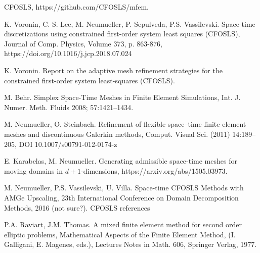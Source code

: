 \documentclass[12pt]{article}
\begin{document}

%


\begin{thebibliography}{100}

CFOSLS, https://github.com/CFOSLS/mfem.

K. Voronin, C.-S. Lee, M. Neumueller, P. Sepulveda, P.S. Vassilevski. Space-time discretizations using constrained first-order system least squares (CFOSLS), Journal of Comp. Physics, Volume 373, p. 863-876, https://doi.org/10.1016/j.jcp.2018.07.024

K. Voronin. Report on the adaptive mesh refinement strategies for the constrained first-order system least-squares (CFOSLS).

M. Behr. Simplex Space-Time Meshes in Finite Element Simulations,
Int. J. Numer. Meth. Fluids 2008; 57:1421–1434.

M. Neumueller, O. Steinbach. Refinement of flexible space–time finite element meshes and discontinuous Galerkin methods, Comput. Visual Sci. (2011) 14:189–205, DOI 10.1007/s00791-012-0174-z

E. Karabelas, M. Neumueller. Generating admissible space-time meshes for moving domains in $d + 1$-dimensions, https://arxiv.org/abs/1505.03973.

M. Neumueller, P.S. Vassilevski, U. Villa. Space-time CFOSLS Methods with AMGe Upscaling, 23th International Conference on Domain Decomposition Methods, 2016 (not sure?).
CFOSLS references

P.A. Raviart, J.M. Thomas. A mixed finite element method for second order elliptic problems, Mathematical Aspects of the Finite Element Method, (I. Galligani, E. Magenes, eds.), Lectures Notes in
Math. 606, Springer Verlag, 1977.


\end{thebibliography}
\end{document}
